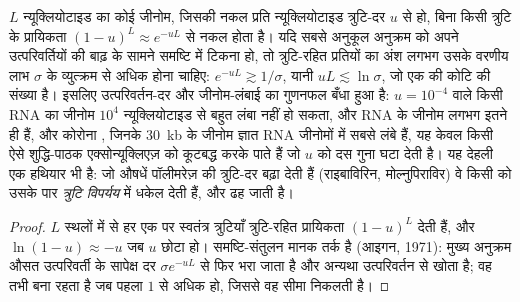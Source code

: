 \begin{proposition}[त्रुटि देहली]\label{prop:b3:virology:error-threshold}
$L$ न्यूक्लियोटाइड का कोई जीनोम, जिसकी नकल प्रति न्यूक्लियोटाइड
त्रुटि-दर $u$ से हो, बिना किसी त्रुटि के प्रायिकता
$(1-u)^{L} \approx e^{-uL}$ से नकल होता है।
यदि सबसे अनुकूल अनुक्रम को अपने उत्परिवर्तियों की बाढ़ के सामने समष्टि
में टिकना हो, तो त्रुटि-रहित प्रतियों का अंश लगभग उसके वरणीय लाभ
$\sigma$ के व्युत्क्रम से अधिक होना चाहिए: $e^{-uL} \gtrsim
1/\sigma$, यानी $uL \lesssim \ln\sigma$, जो एक की कोटि की संख्या है।
इसलिए उत्परिवर्तन-दर और जीनोम-लंबाई का गुणनफल बँधा हुआ है: $u = 10^{-4}$
वाले किसी RNA  का जीनोम
$10^{4}$ न्यूक्लियोटाइड से बहुत लंबा नहीं हो सकता, और RNA  के
जीनोम लगभग इतने ही हैं, और कोरोना , जिनके \qty{30}{kb} के जीनोम
ज्ञात RNA जीनोमों में सबसे लंबे हैं, यह केवल किसी ऐसे शुद्धि-पाठक
एक्सोन्यूक्लिएज़ को कूटबद्ध करके पाते हैं जो $u$ को दस गुना घटा देती
है। यह देहली एक हथियार भी है: जो औषधें पॉलीमरेज़ की त्रुटि-दर बढ़ा देती
हैं (राइबाविरिन, मोल्नुपिराविर) वे किसी  को उसके पार
\emph{त्रुटि विपर्यय} में धकेल देती हैं, और  ढह जाती है।
\end{proposition}
\begin{proof}
$L$ स्थलों में से हर एक पर स्वतंत्र त्रुटियाँ त्रुटि-रहित प्रायिकता
$(1-u)^{L}$ देती हैं, और $\ln(1-u) \approx -u$ जब $u$ छोटा हो।
समष्टि-संतुलन मानक  तर्क है (आइगन, 1971): मुख्य
अनुक्रम औसत उत्परिवर्ती के सापेक्ष दर $\sigma e^{-uL}$ से फिर भरा जाता
है और अन्यथा उत्परिवर्तन से खोता है; वह तभी बना रहता है जब पहला
$1$ से अधिक हो, जिससे वह सीमा निकलती है।
\end{proof}

